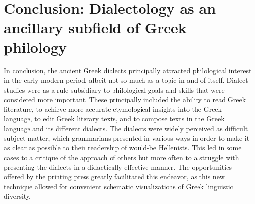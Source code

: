 \section{Conclusion: Dialectology as an ancillary subfield of Greek philology}\label{sec:3.4}

In conclusion, the ancient Greek dialects principally attracted philological interest in the early modern period, albeit not so much as a topic in and of itself. Dialect studies were as a rule subsidiary to philological goals and skills that were considered more important. These principally included the ability to read Greek literature, to achieve more accurate etymological insights into the Greek language, to edit Greek literary texts, and to compose texts in the Greek language and its different dialects. The dialects were widely perceived as difficult subject matter, which grammarians presented in various ways in order to make it as clear as possible to their readership of would-be Hellenists. This led in some cases to a critique of the approach of others but more often to a struggle with presenting the dialects in a didactically effective manner. The opportunities offered by the printing press greatly facilitated this endeavor, as this new technique allowed for convenient schematic visualizations of Greek linguistic diversity.

